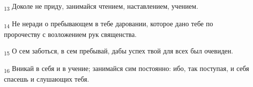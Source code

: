 \begin{tcolorbox}
\textsubscript{13} Доколе не приду, занимайся чтением, наставлением, учением.
\end{tcolorbox}
\begin{tcolorbox}
\textsubscript{14} Не неради о пребывающем в тебе даровании, которое дано тебе по пророчеству с возложением рук священства.
\end{tcolorbox}
\begin{tcolorbox}
\textsubscript{15} О сем заботься, в сем пребывай, дабы успех твой для всех был очевиден.
\end{tcolorbox}
\begin{tcolorbox}
\textsubscript{16} Вникай в себя и в учение; занимайся сим постоянно: ибо, так поступая, и себя спасешь и слушающих тебя.
\end{tcolorbox}
